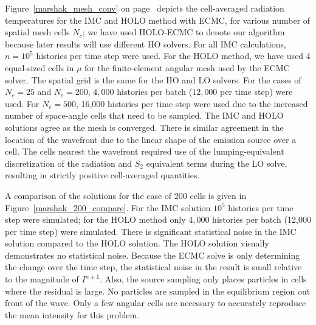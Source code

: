 Figure~\ref{marshak_mesh_conv} on page~\pageref{marshak_mesh_conv} depicts the cell-averaged radiation temperatures  for the
IMC and HOLO method with ECMC, for various number of spatial mesh cells $N_c$; we
have used HOLO-ECMC to denote our algorithm because later results will use different HO solvers.   For
all IMC calculations, $n=10^5$ histories per time step were used.  For the HOLO method, we have used
4 equal-sized cells in $\mu$ for the finite-element angular mesh used by the ECMC
solver.  The spatial grid is the same for the HO and LO solvers. For the cases
of $N_c=25$ and $N_c=200$, $4,000$ histories per batch ($12,000$ per time step)
were used.  For $N_c=500$, 16,000 histories per time step were used due to the increased
number of space-angle cells that
need to be sampled. The IMC and HOLO solutions agree as the mesh is converged.  There is
similar agreement in the location of the wavefront due to the linear shape of the emission source over a cell.  The cells
nearest the wavefront required use of the lumping-equivalent discretization of the
radiation and
$S_2$ equivalent terms during the LO
solve, resulting in strictly positive cell-averaged quantities.  

A comparison of the solutions for the case of 200 cells is given in Figure~\ref{marshak_200_compare}. 
For the IMC solution $10^5$ histories per time step were
simulated; for the HOLO method only $4,000$ histories per batch
(12,000 per time step) were simulated. There is significant statistical noise in the IMC solution
compared to the HOLO solution.  The HOLO solution visually demonstrates no
statistical noise.  Because the ECMC solve is only determining the change over the
time step, the statistical noise in the result is small relative to the magnitude of
$I^{n+1}$.  Also, the source sampling only places particles in cells where the residual is
large.  No particles are sampled in the equilibrium region out front of the wave.  Only a
few angular cells are necessary to accurately reproduce the mean intensity for this problem.

